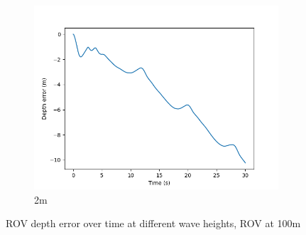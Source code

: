 \documentclass[class=article, crop=false]{standalone}
\begin{document}
\begin{figure}
\begin{subfigure}[b]{0.48\textwidth}
        \includegraphics{scenario1/rov-100m/2.0m/rov_depth_error_uncontrolled}
        \caption{2m}
        \label{}
    \end{subfigure}

    \caption{ROV depth error over time at different wave heights, ROV at 100m}
\end{figure}
\end{document}
